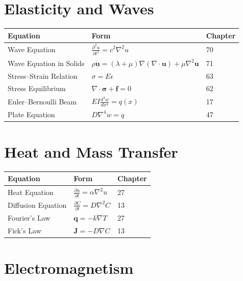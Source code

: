 \section*{Elasticity and Waves}

\begin{center}
\begin{tabular}{lll}
\hline
\textbf{Equation} & \textbf{Form} & \textbf{Chapter} \\
\hline
Wave Equation & $\frac{\partial^2 u}{\partial t^2} = c^2 \nabla^2 u$ & 70 \\
Wave Equation in Solids & $\rho \ddot{\mathbf{u}} = (\lambda + \mu)\nabla(\nabla \cdot \mathbf{u}) + \mu \nabla^2 \mathbf{u}$ & 71 \\
Stress--Strain Relation & $\sigma = E\epsilon$ & 63 \\
Stress Equilibrium & $\nabla \cdot \boldsymbol{\sigma} + \mathbf{f} = 0$ & 62 \\
Euler--Bernoulli Beam & $EI \frac{d^4 w}{dx^4} = q(x)$ & 17 \\
Plate Equation & $D\nabla^4 w = q$ & 47 \\
\hline
\end{tabular}
\end{center}

\section*{Heat and Mass Transfer}

\begin{center}
\begin{tabular}{lll}
\hline
\textbf{Equation} & \textbf{Form} & \textbf{Chapter} \\
\hline
Heat Equation & $\frac{\partial u}{\partial t} = \alpha \nabla^2 u$ & 27 \\
Diffusion Equation & $\frac{\partial C}{\partial t} = D \nabla^2 C$ & 13 \\
Fourier's Law & $\mathbf{q} = -k \nabla T$ & 27 \\
Fick's Law & $\mathbf{J} = -D \nabla C$ & 13 \\
\hline
\end{tabular}
\end{center}

\section*{Electromagnetism}

